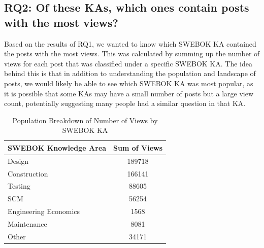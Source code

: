 \documentclass{sigchi}
\begin{document}
\subsection{RQ2: Of these KAs, which ones contain posts with the most views?}
Based on the results of RQ1, we wanted to know which SWEBOK KA contained the posts with the most views. This was calculated by summing up the number of views for each post that was classified under a specific SWEBOK KA. The idea behind this is that in addition to understanding the population and landscape of posts, we would likely be able to see which SWEBOK KA was most popular, as it is possible that some KAs may have a small number of posts but a large view count, potentially suggesting many people had a similar question in that KA. 
\begin{table}[H] %
\centering
\begin{tabular}{|l|c|}
\hline
\textbf{SWEBOK Knowledge Area}       & \multicolumn{1}{l|}{\textbf{Sum of Views}} \\ \hline
Design                & 189718                                     \\ \hline
Construction          & 166141                                     \\ \hline
Testing               & 88605                                      \\ \hline
SCM                   & 56254                                      \\ \hline
Engineering Economics & 1568                                       \\ \hline
Maintenance          & 8081                                       \\ \hline
Other                & 34171                                      \\ \hline
\end{tabular}
\caption{Population Breakdown of Number of Views by SWEBOK KA}
\label{table:viewBreakdownAllSwebokKAs}
\end{table}
\end{document}
